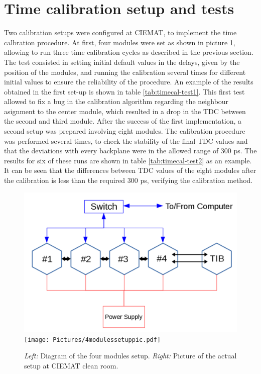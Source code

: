 \documentclass[main.tex]{subfiles}
\begin{document}
\section{Time calibration setup and tests}

Two calibration setups were configured at CIEMAT, to implement the time calbration procedure. At first, four modules were set as shown in picture \ref{fig:timecalfig1}, allowing to run three time calibration cycles as described in the previous section. The test consisted in setting initial default values in the delays, given by the position of the modules, and running the calibration several times for different initial values to ensure the reliability of the procedure. An example of the results obtained in the first set-up is shown in table \ref{tab:timecal-test1}. This first test allowed to fix a bug in the calibration algorithm regarding the neighbour asignment to the center module, which resulted in a drop in the TDC between the second and third module. 
After the success of the first implementation, a second setup was prepared involving eight modules. The calibration procedure was performed several times, to check the stability of the final TDC values and that the deviations with every backplane were in the allowed range of 300 ps. The results for six of these runs are shown in table \ref{tab:timecal-test2} as an example. It can be seen that the differences between TDC values of the eight modules after the calibration is less than the required 300 ps, verifying the calibration method.

\begin{figure}[!htb]
\includegraphics[width=\linewidth]{Pictures/4modulessetupdiagram.pdf}
\endminipage\hfill
{}
\texttt{[image: Pictures/4modulessetuppic.pdf]}
\endminipage\hfill
\caption{\label{fig:timecalfig1}\textit{Left:} Diagram of the four modules setup. \textit{Right:} Picture of the actual setup at CIEMAT clean room.}
\end{figure}
\end{document}
